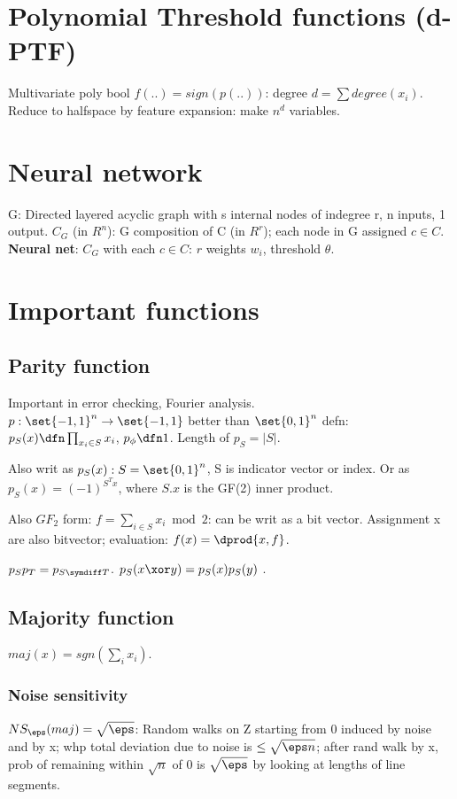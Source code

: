 \documentclass[oneside, article]{memoir}
\begin{document}
\section{Polynomial Threshold functions (d-PTF)}
Multivariate poly bool $f(..)=sign(p(..))$: degree $d = \sum degree(x_{i})$. Reduce to halfspace by feature expansion: make $n^{d}$ variables.

\section{Neural network}
G: Directed layered acyclic graph with s internal nodes of indegree r, n inputs, 1 output. $C_{G}$ (in $R^{n}$): G composition of C (in $R^{r}$); each node in G assigned $c \in C$. \textbf{Neural net}: $C_{G}$ with each $c \in C$: $r$ weights $w_{i}$, threshold $\theta$.

\section{Important functions}
\subsection{Parity function}
Important in error checking, Fourier analysis. \\
$p:\set{-1, 1}^{n} \to \set{-1, 1}$ better than $\set{0, 1}^{n}$ defn: $p_{S}(x) \dfn \prod_{x_{i} \in S} x_{i}$, $p_{\phi} \dfn 1$. Length of $p_S = |S|$.

Also writ as $p_{S}(x) : S = \set{0,1}^{n}$, S is indicator vector or index. Or as $p_{S}(x) = (-1)^{S^{T}x}$, where $S.x$ is the GF(2) inner product.

Also $GF_2$ form: $f = \sum_{i \in S} x_{i} \bmod 2$: can be writ as a bit vector. Assignment x are also bitvector; evaluation: $f(x) = \dprod{x, f}$.

$p_{S}p_{T} = p_{S\symdiff T}$. $p_{S}(x \xor y) = p_{S}(x)p_{S}(y)$ \chk.

\subsection{Majority function}
$maj(x) = sgn(\sum_{i} x_{i})$.

\subsubsection{Noise sensitivity}
$NS_{\eps}(maj) = \sqrt{\eps}$: Random walks on Z starting from 0 induced by noise and by x; whp total deviation due to noise is $\leq \sqrt{\eps n}$; after rand walk by x, prob of remaining within $\sqrt{n}$ of 0 is $\sqrt{\eps}$ by looking at lengths of line segments.

\tbc




\end{document}
